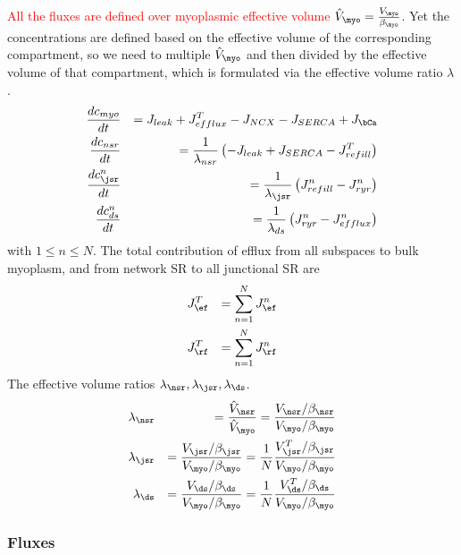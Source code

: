 \textcolor{red}{All the fluxes are defined over myoplasmic effective
  volume $\hat{V}_\myo=\frac{V_\myo}{\beta_\myo}$}.
Yet the concentrations are defined based on the effective volume of
the corresponding compartment, so we need to multiple $\hat{V}_\myo$
and then divided by the effective volume of that compartment, which is
formulated via the effective volume ratio $\lambda$.
\begin{eqnarray}
  \label{eq:1006}
  \frac{dc_{myo}}{dt} &&=  J_{leak}+J^T_{efflux} - J_{NCX} - J_{SERCA} +
  J_\bCa \\
  \frac{dc_{nsr}}{dt} &&= \frac{1}{\lambda_{nsr}} \left( -J_{leak} +
    J_{SERCA} - J^T_{refill} \right)\\
  \frac{dc^n_\jsr}{dt} &&= \frac{1}{\lambda_\jsr} \left( J^n_{refill} -J^n_{ryr} \right)\\
  \frac{dc^n_{ds}}{dt} &&= \frac{1}{\lambda_{ds}} \left( J^n_{ryr} -J^n_{efflux} \right)
\end{eqnarray}
with $1\le n\le N$. The total contribution of efflux from all
subspaces to bulk myoplasm, and from network SR to all junctional SR
are
\begin{eqnarray}
  \label{eq:1007}
  J^T_\ef &&= \sum^N_{n=1} J^n_\ef \\
  J^T_\rf &&= \sum^N_{n=1} J^n_\rf \\
\end{eqnarray}
The effective volume ratios $\lambda_\nsr,\lambda_\jsr,\lambda_\ds$.
\begin{eqnarray}
  \label{eq:1010}
  \lambda_\nsr &&= \frac{\hat{V}_\nsr}{\hat{V}_\myo}= \frac{V_\nsr/\beta_\nsr}{V_\myo/\beta_\myo} \\
  \lambda_\jsr &&= \frac{V_\jsr/\beta_\jsr}{V_\myo/\beta_\myo} =
  \frac{1}{N} \frac{V^T_\jsr/\beta_\jsr}{V_\myo/\beta_\myo}  \\
  \lambda_\ds &&= \frac{V_\ds/\beta_\ds}{V_\myo/\beta_\myo} =\frac{1}{N}\frac{V^T_\ds/\beta_\ds}{V_\myo/\beta_\myo} 
\end{eqnarray}

\subsubsection{Fluxes}
\label{sec:fluxes-4}

